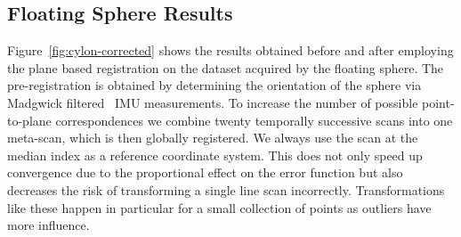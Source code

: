 \subsection{Floating Sphere Results}

Figure~\ref{fig:cylon-corrected} shows the results obtained before and after employing the plane based registration on the dataset acquired by the floating sphere.
The pre-registration is obtained by determining the orientation of the sphere via Madgwick filtered~\cite{madgwick2010efficient} IMU measurements.
To increase the number of possible point-to-plane correspondences we combine twenty temporally successive scans into one meta-scan, which is then globally registered. 
We always use the scan at the median index as a reference coordinate system.
This does not only speed up convergence due to the proportional effect on the error function but also decreases the risk of transforming a single line scan incorrectly.
Transformations like these happen in particular for a small collection of points as outliers have more influence.

